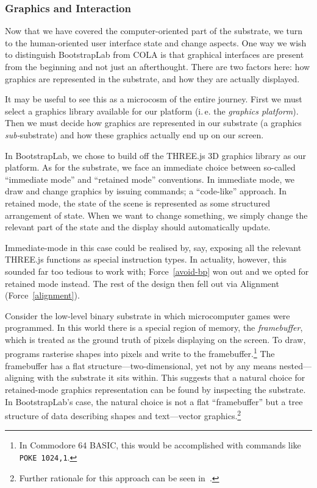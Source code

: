 \documentclass[ twoside,openright,titlepage,numbers=noenddot,headinclude,footinclude,cleardoublepage=empty,abstract=on,
                BCOR=5mm,paper=a4,fontsize=11pt
                ]{scrreprt}
\newcommand{\ie}{i.\,e.}
\theoremstyle{definition}
\begin{document}
\hypertarget{graphics-and-interaction}{\subsubsection{Graphics and
Interaction}\label{graphics-and-interaction}}

Now that we have covered the computer-oriented part of the substrate, we
turn to the human-oriented user interface state and change aspects. One
way we wish to distinguish BootstrapLab from \ac{COLA} is that graphical
interfaces are present from the beginning and not just an afterthought.
There are two factors here: how graphics are represented in the
substrate, and how they are actually displayed.

It may be useful to see this as a microcosm of the entire journey. First
we must select a graphics library available for our platform (\ie{} the
\emph{graphics platform}). Then we must decide how graphics are
represented in our substrate (a graphics \emph{sub-}substrate) and how
these graphics actually end up on our screen.

In BootstrapLab, we chose to build off the THREE.js 3D graphics library
as our platform. As for the substrate, we face an immediate choice
between so-called ``immediate mode'' and ``retained mode'' conventions.
In immediate mode, we draw and change graphics by issuing commands; a
``code-like'' approach. In retained mode, the state of the scene is
represented as some structured arrangement of state. When we want to
change something, we simply change the relevant part of the state and
the display should automatically update.

Immediate-mode in this case could be realised by, say, exposing all the
relevant THREE.js functions as special instruction types. In actuality,
however, this sounded far too tedious to work with; Force~\ref{avoid-bp}
won out and we opted for retained mode instead. The rest of the design
then fell out via Alignment (Force~\ref{alignment}).

Consider the low-level binary substrate in which microcomputer games
were programmed. In this world there is a special region of memory, the
\emph{framebuffer}, which is treated as the ground truth of pixels
displaying on the screen. To draw, programs rasterise shapes into pixels
and write to the framebuffer.\footnote{In Commodore 64 BASIC, this would
  be accomplished with commands like \texttt{POKE\ 1024,1}.} The
framebuffer has a flat structure---two-dimensional, yet not by any means
nested---aligning with the substrate it sits within. This suggests that
a natural choice for retained-mode graphics representation can be found
by inspecting the substrate. In BootstrapLab's case, the natural choice
is not a flat ``framebuffer'' but a tree structure of data describing
shapes and text---vector graphics.\footnote{Further rationale for this
  approach can be seen in~\parencite{Dadgum66}.}
\end{document}
